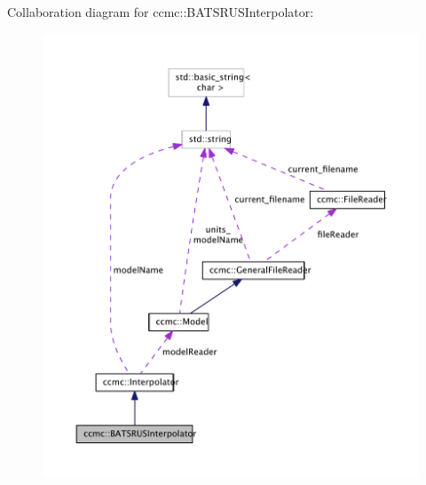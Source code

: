 Collaboration diagram for ccmc\-:\-:B\-A\-T\-S\-R\-U\-S\-Interpolator\-:\nopagebreak
\begin{figure}[H]
\begin{center}
\leavevmode
\includegraphics[width=350pt]{classccmc_1_1_b_a_t_s_r_u_s_interpolator__coll__graph}
\end{center}
\end{figure}
